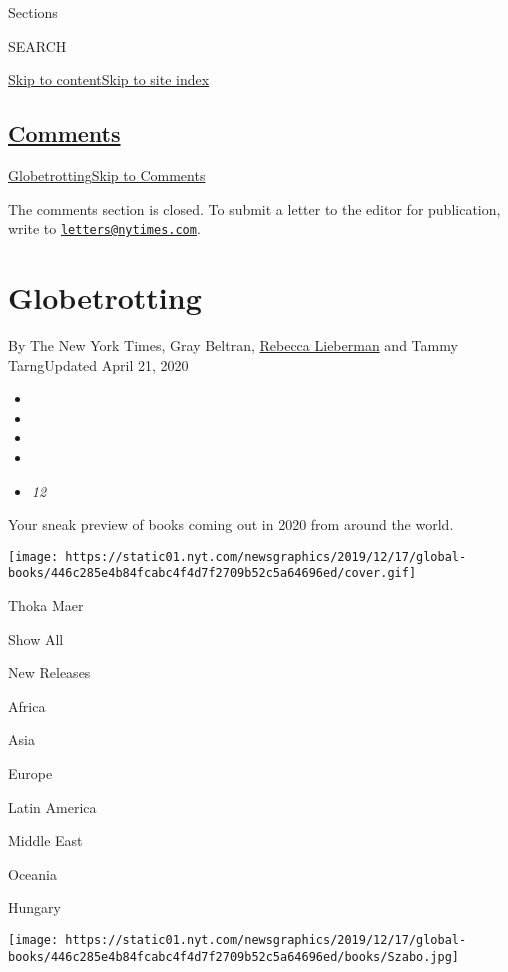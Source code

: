 Sections

SEARCH

\protect\hyperlink{site-content}{Skip to
content}\protect\hyperlink{site-index}{Skip to site index}

\hypertarget{comments}{%
\subsection{\texorpdfstring{\protect\hyperlink{commentsContainer}{Comments}}{Comments}}\label{comments}}

\href{}{Globetrotting}\href{}{Skip to Comments}

The comments section is closed. To submit a letter to the editor for
publication, write to
\href{mailto:letters@nytimes.com}{\nolinkurl{letters@nytimes.com}}.

\hypertarget{globetrotting}{%
\section{Globetrotting}\label{globetrotting}}

By The New York Times, Gray Beltran,
\href{https://www.nytimes.com/by/rebecca-lieberman}{Rebecca Lieberman}
and Tammy TarngUpdated April 21, 2020

\begin{itemize}
\item
\item
\item
\item
\item
  \emph{12}
\end{itemize}

Your sneak preview of books coming out in 2020 from around the world.

\texttt{[image: https://static01.nyt.com/newsgraphics/2019/12/17/global-books/446c285e4b84fcabc4f4d7f2709b52c5a64696ed/cover.gif]}

Thoka Maer

Show All

New Releases

Africa

Asia

Europe

Latin America

Middle East

Oceania

Hungary

\texttt{[image: https://static01.nyt.com/newsgraphics/2019/12/17/global-books/446c285e4b84fcabc4f4d7f2709b52c5a64696ed/books/Szabo.jpg]}


